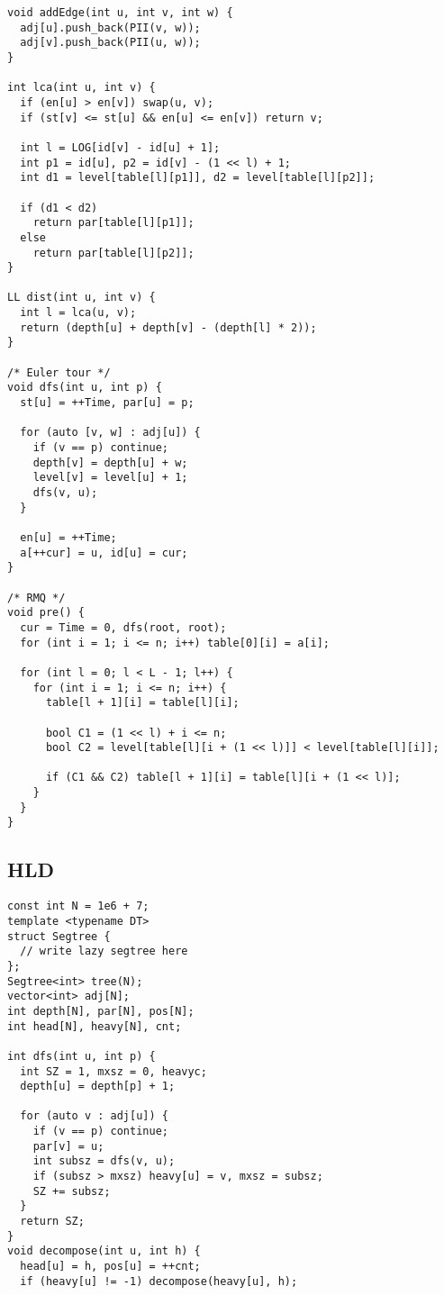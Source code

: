 \documentclass[FSZ,a4paper,onesided]{article}
\begin{document}
\begin{multicols*}{\COLS}
\begin{lstlisting}
void addEdge(int u, int v, int w) {
  adj[u].push_back(PII(v, w));
  adj[v].push_back(PII(u, w));
}

int lca(int u, int v) {
  if (en[u] > en[v]) swap(u, v);
  if (st[v] <= st[u] && en[u] <= en[v]) return v;

  int l = LOG[id[v] - id[u] + 1];
  int p1 = id[u], p2 = id[v] - (1 << l) + 1;
  int d1 = level[table[l][p1]], d2 = level[table[l][p2]];

  if (d1 < d2)
    return par[table[l][p1]];
  else
    return par[table[l][p2]];
}

LL dist(int u, int v) {
  int l = lca(u, v);
  return (depth[u] + depth[v] - (depth[l] * 2));
}

/* Euler tour */
void dfs(int u, int p) {
  st[u] = ++Time, par[u] = p;

  for (auto [v, w] : adj[u]) {
    if (v == p) continue;
    depth[v] = depth[u] + w;
    level[v] = level[u] + 1;
    dfs(v, u);
  }

  en[u] = ++Time;
  a[++cur] = u, id[u] = cur;
}

/* RMQ */
void pre() {
  cur = Time = 0, dfs(root, root);
  for (int i = 1; i <= n; i++) table[0][i] = a[i];

  for (int l = 0; l < L - 1; l++) {
    for (int i = 1; i <= n; i++) {
      table[l + 1][i] = table[l][i];

      bool C1 = (1 << l) + i <= n;
      bool C2 = level[table[l][i + (1 << l)]] < level[table[l][i]];

      if (C1 && C2) table[l + 1][i] = table[l][i + (1 << l)];
    }
  }
}
\end{lstlisting}
\subsection{HLD}
\begin{lstlisting}
const int N = 1e6 + 7;
template <typename DT>
struct Segtree {
  // write lazy segtree here
};
Segtree<int> tree(N);
vector<int> adj[N];
int depth[N], par[N], pos[N];
int head[N], heavy[N], cnt;

int dfs(int u, int p) {
  int SZ = 1, mxsz = 0, heavyc;
  depth[u] = depth[p] + 1;

  for (auto v : adj[u]) {
    if (v == p) continue;
    par[v] = u;
    int subsz = dfs(v, u);
    if (subsz > mxsz) heavy[u] = v, mxsz = subsz;
    SZ += subsz;
  }
  return SZ;
}
void decompose(int u, int h) {
  head[u] = h, pos[u] = ++cnt;
  if (heavy[u] != -1) decompose(heavy[u], h);


\end{lstlisting}
\end{multicols*}
\end{document}

